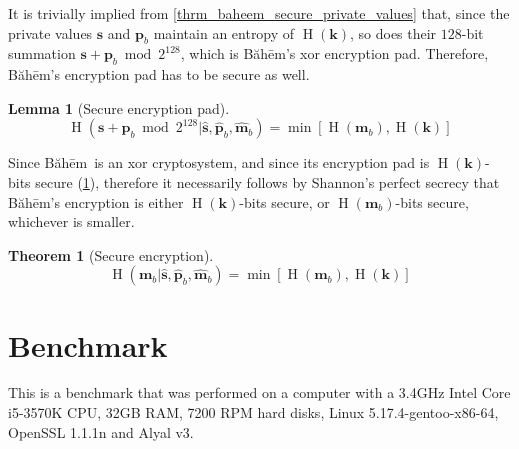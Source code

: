 \documentclass[twocolumn,hidelinks]{article}
\newcommand{\baheem}{Băhēm}
\DeclareMathOperator{\entropy}{H}
\newtheorem{lemma}{Lemma}
\newtheorem{theorem}{Theorem}
\begin{document}
It is trivially implied from \cref{thrm_baheem_secure_private_values} that,
since the private values $\mathbf{s}$ and $\mathbf{p}_b$ maintain an
entropy of $\entropy(\mathbf{k})$, so does their $128$-bit summation
$\mathbf{s} + \mathbf{p}_b \bmod{2^{128}}$, which is \baheem's \gls{xor}
encryption pad.  Therefore, \baheem's encryption pad has to be secure as
well.

\begin{lemma}[Secure encryption pad]
    \[
        \entropy(
            \mathbf{s} + \mathbf{p}_b \bmod{2^{128}}
            | \mathbf{\hat s},
              \mathbf{\hat p}_b,
              \mathbf{\hat m}_b
        )
        = \min[\entropy(\mathbf{m}_b), \entropy(\mathbf{k})]
    \]
    \label{thrm_baheem_secure_encryption_pad}
\end{lemma}

Since \baheem\ is an \gls{xor} cryptosystem, and since its encryption pad
is $\entropy(\mathbf{k})$-bits secure
(\cref{thrm_baheem_secure_encryption_pad}), therefore it necessarily
follows by Shannon's perfect secrecy \cite{perfect_secrecy} that \baheem's
encryption is either $\entropy(\mathbf{k})$-bits secure, or
$\entropy(\mathbf{m}_b)$-bits secure, whichever is smaller.

\begin{theorem}[Secure encryption]
    \[
        \entropy(
            \mathbf{m}_b
            | \mathbf{\hat s},
              \mathbf{\hat p}_b,
              \mathbf{\hat m}_b
        )
        = \min[\entropy(\mathbf{m}_b), \entropy(\mathbf{k})]
    \]
    \label{thrm_baheem_secure}
\end{theorem}


\section{Benchmark}\label{sec_benchmark}
This is a benchmark that was performed on a computer with a 3.4GHz Intel
Core i5-3570K CPU, 32GB RAM, 7200 RPM hard disks, Linux
5.17.4-gentoo-x86-64, OpenSSL 1.1.1n and Alyal v3.
\end{document}

